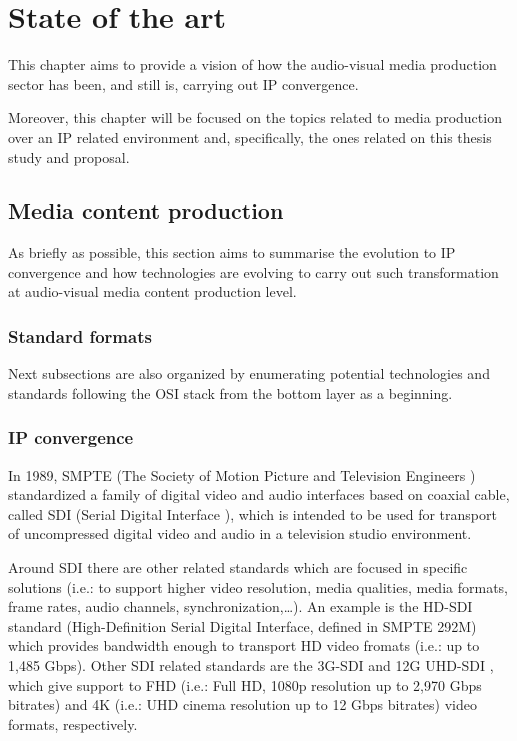 \chapter{State of the art}\label{A:stateOfTheArt}

This chapter aims to provide a vision of how the audio-visual media production sector has been, and still is, carrying out IP convergence. 

Moreover, this chapter will be focused on the topics related to media production over an IP related environment and, specifically, the ones related on this thesis study and proposal.

\section{Media content production}

As briefly as possible, this section aims to summarise the evolution to IP convergence and how technologies are evolving to carry out such transformation at audio-visual media content production level.

\subsection{Standard formats}



Next subsections are also organized by enumerating potential technologies and standards following the OSI \cite{osi} stack from the bottom layer as a beginning.

\subsection{IP convergence}

In 1989, SMPTE (The Society of Motion Picture and Television Engineers \cite{smpte}) standardized a family of digital video and audio interfaces based on coaxial cable, called SDI (Serial Digital Interface \cite{SDI}), which is intended to be used for transport of uncompressed digital video and audio in a television studio environment. 

Around SDI there are other related standards which are focused in specific solutions (i.e.: to support higher video resolution, media qualities, media formats, frame rates, audio channels, synchronization,\ldots). An example is the HD-SDI \cite{SDI} standard (High-Definition Serial Digital Interface, defined in SMPTE 292M) which provides bandwidth enough to transport HD video fromats (i.e.: up to 1,485 Gbps). Other SDI related standards are the 3G-SDI \cite{3GSDI} and 12G UHD-SDI \cite{UHDSDI}, which give support to FHD (i.e.: Full HD, 1080p resolution up to 2,970 Gbps bitrates) and 4K (i.e.: UHD cinema resolution up to 12 Gbps bitrates) video formats, respectively. 

